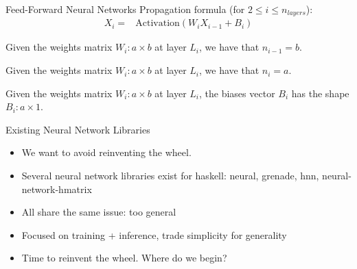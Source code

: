 \documentclass{beamer}
\begin{document}
\begin{frame}{Feed-Forward Neural Networks}
  Propagation formula (for $2 \leq i \leq n_{layers}$):
  \begin{align*}
    X_i = &\text{Activation}(W_iX_{i - 1} + B_i)
  \end{align*} 

  \begin{lemma} \label{lem:1}
    Given the weights matrix $W_i: a \times b$ at layer $L_i$, we have that $n_{i - 1} = b$.
  \end{lemma} \label{lem:2}
  \begin{lemma}
    Given the weights matrix $W_i: a \times b$ at layer $L_i$, we have that $n_i = a$.
  \end{lemma}
  \begin{lemma} \label{lem:3}
    Given the weights matrix $W_i: a \times b$ at layer $L_i$, the biases vector $B_i$ has the shape $B_i: a \times 1$.
  \end{lemma}
\end{frame}

\begin{frame}{Existing Neural Network Libraries}
  \begin{itemize}
    \item We want to avoid reinventing the wheel.
    \item Several neural network libraries exist for haskell: neural, grenade, hnn, neural-network-hmatrix
    \item All share the same issue: too general
    \item Focused on training + inference, trade simplicity for generality
    \item<2-> Time to reinvent the wheel. Where do we begin?
  \end{itemize}
\end{frame}
\end{document}
